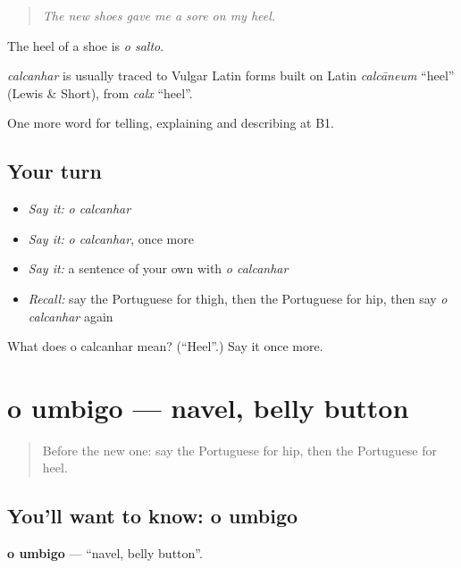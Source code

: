 \begin{quote}
\emph{The new shoes gave me a sore on my heel.}
\end{quote}

The heel of a shoe is \emph{o salto}.

\begin{cousinweb}
\emph{calcanhar} is usually traced to Vulgar Latin forms built on Latin \emph{calcāneum} \textquotedblleft{}heel\textquotedblright{} (Lewis \& Short), from \emph{calx} \textquotedblleft{}heel\textquotedblright{}.
\end{cousinweb}

\begin{grammarlens}[title={What you've built}]
One more word for telling, explaining and describing at B1.
\end{grammarlens}

\subsection*{Your turn}
\begin{itemize}
\raggedright
  \item \emph{Say it:} \emph{o calcanhar}
  \item \emph{Say it:} \emph{o calcanhar}, once more
  \item \emph{Say it:} a sentence of your own with \emph{o calcanhar}
  \item \emph{Recall:} say the Portuguese for thigh, then the Portuguese for hip, then say \emph{o calcanhar} again
\end{itemize}

\begin{tcolorbox}[breakable,colback=teal!4,colframe=teal!35!black,title={Before you move on}]
What does o calcanhar mean? (\textquotedblleft{}Heel\textquotedblright{}.) Say it once more.
\end{tcolorbox}
\section[o umbigo]{o umbigo — navel, belly button}

\label{lesson:PT-C482-umbigo}



\begin{quote}
Before the new one: say the Portuguese for hip, then the Portuguese for heel.
\end{quote}

\subsection*{You'll want to know: o umbigo}
\textbf{o umbigo} — \textquotedblleft{}navel, belly button\textquotedblright{}.

